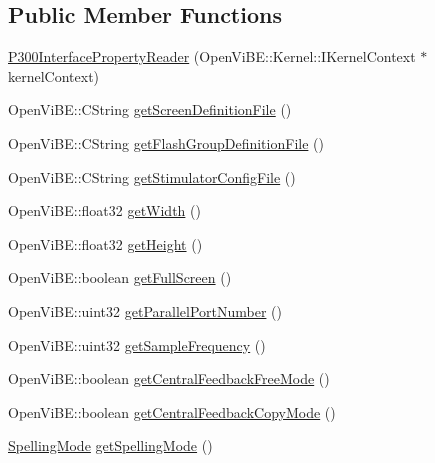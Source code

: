 \subsection*{Public Member Functions}
\begin{DoxyCompactItemize}
\item 
\hyperlink{classOpenViBEApplications_1_1P300InterfacePropertyReader_acbb443b37d7d14b665edc0efd3fe5b2b}{P300InterfacePropertyReader} (OpenViBE::Kernel::IKernelContext $\ast$kernelContext)
\item 
OpenViBE::CString \hyperlink{classOpenViBEApplications_1_1P300InterfacePropertyReader_af28a34203fd06e876e2415d4692b6377}{getScreenDefinitionFile} ()
\item 
OpenViBE::CString \hyperlink{classOpenViBEApplications_1_1P300InterfacePropertyReader_a8d709edd6536c4d1861110261a972435}{getFlashGroupDefinitionFile} ()
\item 
OpenViBE::CString \hyperlink{classOpenViBEApplications_1_1P300InterfacePropertyReader_aba2b0c57612c5594cd9b71c4fffa7ddf}{getStimulatorConfigFile} ()
\item 
OpenViBE::float32 \hyperlink{classOpenViBEApplications_1_1P300InterfacePropertyReader_a35d79b5058d54e0f6ec878ba044780ba}{getWidth} ()
\item 
OpenViBE::float32 \hyperlink{classOpenViBEApplications_1_1P300InterfacePropertyReader_a78c7c6e1ca2ea63b56ad40173ecef9ec}{getHeight} ()
\item 
OpenViBE::boolean \hyperlink{classOpenViBEApplications_1_1P300InterfacePropertyReader_adba356402936e3af7eb85369fbf8e31c}{getFullScreen} ()
\item 
OpenViBE::uint32 \hyperlink{classOpenViBEApplications_1_1P300InterfacePropertyReader_a24ff16fdbdee13f62c6617697c99f4e2}{getParallelPortNumber} ()
\item 
OpenViBE::uint32 \hyperlink{classOpenViBEApplications_1_1P300InterfacePropertyReader_a754122a854e4bfd491ace8f6782b99e8}{getSampleFrequency} ()
\item 
OpenViBE::boolean \hyperlink{classOpenViBEApplications_1_1P300InterfacePropertyReader_a36502962c6b04e671d6f80dc8728cb05}{getCentralFeedbackFreeMode} ()
\item 
OpenViBE::boolean \hyperlink{classOpenViBEApplications_1_1P300InterfacePropertyReader_a284e58f2b72523319c421e1c29182c5a}{getCentralFeedbackCopyMode} ()
\item 
\hyperlink{namespaceOpenViBEApplications_ab6ab87a925d53afcb139f384cbf23f39}{SpellingMode} \hyperlink{classOpenViBEApplications_1_1P300InterfacePropertyReader_adbaa05192dd3de1088a5c066a69a77f6}{getSpellingMode} ()

\end{DoxyCompactItemize}

